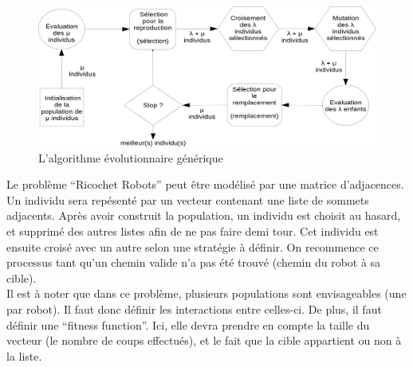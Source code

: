 \begin{figure}
  \includegraphics[width=\linewidth]{img/cycle.png}
  \caption{L'algorithme \'evolutionnaire g\'en\'erique \cite{MOP}}
\end{figure}

Le probl\`eme ``Ricochet Robots'' peut \^etre mod\'elis\'e par une matrice d'adjacences. Un individu sera rep\'esent\'e par un vecteur contenant une liste de sommets adjacents. Apr\`es avoir construit la population, un individu est choisit au hasard, et supprim\'e des autres listes afin de ne pas faire demi tour. Cet individu est ensuite crois\'e avec un autre selon une strat\'egie \`a d\'efinir. On recommence ce processus tant qu'un chemin valide n'a pas \'et\'e trouv\'e (chemin du robot \`a sa cible).\\
Il est \`a noter que dans ce probl\`eme, plusieurs populations sont envisageables (une par robot). Il faut donc d\'efinir les interactions entre celles-ci. De plus, il faut d\'efinir une ``fitness function''. Ici, elle devra prendre en compte la taille du vecteur (le nombre de coups effectu\'es), et le fait que la cible appartient ou non \`a la liste.
